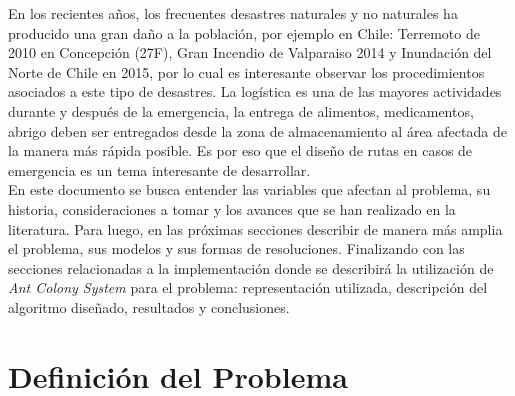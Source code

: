 \documentclass[letter, 10pt]{article}
\begin{document}
En los recientes años, los frecuentes desastres naturales y no naturales ha producido una gran daño a la población, por ejemplo en Chile: Terremoto de 2010 en Concepción (27F), Gran Incendio de Valparaiso 2014 y Inundación del Norte de Chile en 2015, por lo cual es interesante observar los procedimientos asociados a este tipo de desastres. La logística es una de las mayores actividades durante y después de la emergencia, la entrega de alimentos, medicamentos, abrigo deben ser entregados desde la zona de almacenamiento al área afectada de la manera más rápida posible. Es por eso que el diseño de rutas en casos de emergencia es un tema interesante de desarrollar. \\
En este documento se busca entender las variables que afectan al problema, su historia, consideraciones a tomar y los avances que se han realizado en la literatura. Para luego, en las próximas secciones describir de manera más amplia el problema, sus modelos y sus formas de resoluciones. Finalizando con las secciones relacionadas a la implementación donde se describirá la utilización de \textit{Ant Colony System} para el problema: representación utilizada, descripción del algoritmo diseñado, resultados y conclusiones. 

\section{Definici\'on del Problema}
\end{document}
